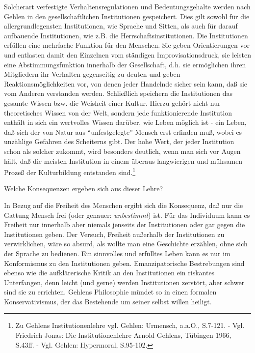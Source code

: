 \documentclass[12pt,a4paper]{article}
\begin{document}
Solcherart verfestigte Verhaltensregulationen und Bedeutungsgehalte
we\-rden nach Gehlen in den gesellschaftlichen Institutionen
gespeichert. Dies gilt sowohl für die allergrundlegensten Institutionen,
wie Sprache und Sitten, als auch für darauf aufbauende Institutionen,
wie z.B. die Herrschaftsinstitutionen. Die Institutionen erfüllen eine
mehrfache Funktion für den Menschen. Sie geben Orientierungen vor und
entlasten damit den Einzelnen vom ständigen Improvisationsdruck, sie
leisten eine Abstimmungsfunktion innerhalb der Gesellschaft, d.h. sie
ermöglichen ihren Mitgliedern ihr Verhalten gegenseitig zu deuten und
geben Reaktionsmöglichkeiten vor, von denen jeder Handelnde sicher sein
kann, daß sie vom Anderen verstanden werden. Schließlich speichern die
Institutionen das gesamte Wissen bzw. die Weisheit einer Kultur. Hierzu
gehört nicht nur theoretisches Wissen von der Welt, sondern jede
funktionierende Institution enthält in sich ein wertvolles Wissen
darüber, wie Leben möglich ist - ein Leben, daß sich der von Natur aus
"`unfestgelegte"' Mensch erst erfinden muß, wobei es unzählige Gefahren
des Scheiterns gibt. Der hohe Wert, der jeder Institution schon als
solcher zukommt, wird besonders deutlich, wenn man sich vor Augen hält,
daß die meisten Institution in einem überaus langwierigen und mühsamen
Prozeß der Kulturbildung entstanden sind.\footnote{Zu Gehlens
  Institutionenlehre vgl. Gehlen: Urmensch, a.a.O., S.7-121. - Vgl.
  Friedrich Jonas: Die Institutionenlehre Arnold Gehlens, Tübingen 1966,
  S.43ff. - Vgl.  Gehlen: Hypermoral, S.95-102.}

Welche Konsequenzen ergeben sich aus dieser Lehre?

In Bezug auf die Freiheit des Menschen ergibt sich die Konsequenz, daß
nur die Gattung Mensch frei (oder genauer: {\em unbestimmt}) ist. Für
das Individuum kann es Freiheit nur innerhalb aber niemals jenseits der
Institutionen oder gar gegen die Institutionen geben. Der Versuch,
Freiheit außerhalb der Institutionen zu verwirklichen, wäre so absurd,
als wollte man eine Geschichte erzählen, ohne sich der Sprache zu
bedienen. Ein sinnvolles und erfülltes Leben kann es nur im Konformismus
zu den Institutionen geben. Emanzipatorische Bestrebungen sind ebenso
wie die aufklärerische Kritik an den Institutionen ein riskantes
Unterfangen, denn leicht (und gerne) werden Institutionen zerstört, aber
schwer sind sie zu errichten. Gehlens Philosophie mündet so in einen
formalen Konservativismus, der das Bestehende um seiner selbst willen
heiligt.
\end{document}
